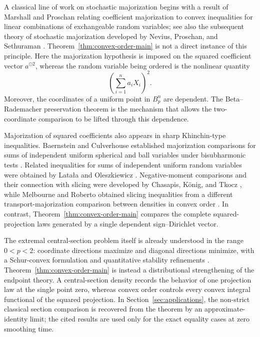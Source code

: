 \documentclass[pdflatex,sn-mathphys-num]{sn-jnl}
\numberwithin{equation}{section}
\theoremstyle{thmstyleone}
\theoremstyle{thmstylethree}
\newcommand{\1}{\mathbf{1}}
\newcommand{\sqvec}[1]{#1^{\odot 2}}
\begin{document}
A classical line of work on stochastic majorization begins with a
result of Marshall and Proschan relating coefficient
majorization to convex inequalities for linear combinations of
exchangeable random variables; see also the subsequent theory of
stochastic majorization developed by Nevius, Proschan, and Sethuraman
\cite{MarshallProschan,NeviusProschanSethuraman}. Theorem~\ref{thm:convex-order-main} is not a direct instance of this principle.
Here the majorization hypothesis is imposed on the squared coefficient
vector $\sqvec a$, whereas the random variable being ordered is the
nonlinear quantity
\[
 \left(\sum_{i=1}^n a_iX_i\right)^2.
\]
Moreover, the coordinates of a uniform point in $B_p^n$ are dependent.
The Beta--Rademacher preservation theorem is the mechanism that allows
the two-coordinate comparison to be lifted through this dependence.

Majorization of squared coefficients also appears in sharp
Khinchin-type inequalities. Baernstein and Culverhouse established
majorization comparisons for sums of independent uniform spherical and
ball variables under bisubharmonic tests
\cite{BaernsteinCulverhouse}. Related inequalities for sums of
independent uniform random variables were obtained by Lata{\l}a and
Oleszkiewicz \cite{LatalaOleszkiewicz}. Negative-moment comparisons
and their connection with slicing were developed by Chasapis,
K{\"o}nig, and Tkocz \cite{ChasapisKonigTkocz}, while Melbourne and
Roberto obtained slicing inequalities from a different
transport-majorization comparison between densities in convex order
\cite{MelbourneRoberto}. In contrast, Theorem~\ref{thm:convex-order-main} compares the complete squared-projection
laws generated by a single dependent sign--Dirichlet vector.

The extremal central-section problem itself is already understood in
the range $0<p<2$: coordinate directions maximize and diagonal
directions minimize, with a Schur-convex formulation and quantitative
stability refinements
\cite{MeyerPajor,Koldobsky1998,Eskenazis,ChasapisNayarTkocz}.
Theorem~\ref{thm:convex-order-main} is instead a distributional
strengthening of the endpoint theory. A central-section
density records the behavior of one projection law at the single point
zero, whereas convex order controls every convex integral functional of
the squared projection. In Section~\ref{sec:applications}, the
non-strict classical section comparison is recovered from the theorem
by an approximate-identity limit; the cited results are used only for
the exact equality cases at zero smoothing time.
\end{document}
